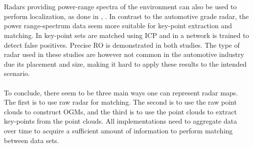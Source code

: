 \\\\
Radars providing power-range spectra of the environment can also be used to perform localization, as done in \cite{cen_precise_2018}, \cite{aldera_what_2019}. In contrast to the automotive grade radar, the power range-spectrum data seem more suitable for key-point extraction and matching. In \cite{cen_radar-only_2019} key-point sets are matched using ICP and in \cite{aldera_what_2019} a network is trained to detect false positives.  Precise \ac{RO} is demonstrated in both studies. The type of radar used in these studies are however not common in the automotive industry due its placement and size, making it hard to apply these results to the intended scenario. 
\\\\
To conclude, there seem to be three main ways one can represent radar maps. The first is to use raw radar for matching. The second is to use the raw point clouds to construct OGMs, and the third is to use the point clouds to extract key-points from the point clouds. All implementations need to aggregate data over time to acquire a sufficient amount of information to perform matching between data sets.
